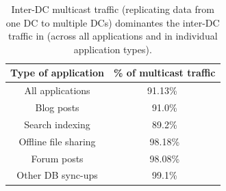 \begin{table}[t]
\begin{center}
\begin{tabular}{| c | c|}
\hline
 \rowcolor[gray]{0.9}
\textbf{Type of application} & \textbf{\% of multicast traffic} \\
\hline\hline
All applications & 91.13\%~\footnotemark[2]\\
\hline
Blog posts & 91.0\% \\%
\hline
Search indexing & 89.2\%\\%
\hline
Offline file sharing & 98.18\%\\%
\hline
Forum posts & 98.08\%\\%
\hline
Other DB sync-ups & 99.1\%\\%
\hline
\end{tabular}
\end{center}
\caption{Inter-DC multicast traffic (replicating data from
one DC to multiple DCs) dominantes the inter-DC traffic
in \company (across all applications and in
individual application types).}
\label{table:rate}
\end{table}


